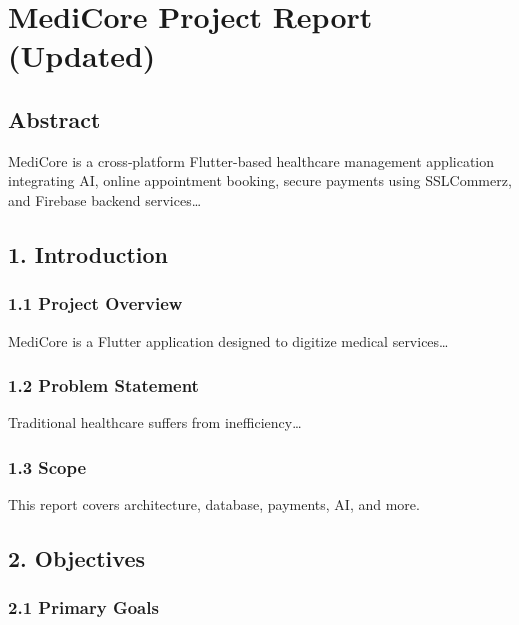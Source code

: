 \documentclass[
]{article}
\author{}
\date{}
\begin{document}
\hypertarget{medicore-project-report-updated}{%
\section{MediCore Project Report
(Updated)}\label{medicore-project-report-updated}}

\hypertarget{abstract}{%
\subsection{Abstract}\label{abstract}}

MediCore is a cross‑platform Flutter-based healthcare management
application integrating AI, online appointment booking, secure payments
using SSLCommerz, and Firebase backend services\ldots{}

\hypertarget{introduction}{%
\subsection{1. Introduction}\label{introduction}}

\hypertarget{project-overview}{%
\subsubsection{1.1 Project Overview}\label{project-overview}}

MediCore is a Flutter application designed to digitize medical
services\ldots{}

\hypertarget{problem-statement}{%
\subsubsection{1.2 Problem Statement}\label{problem-statement}}

Traditional healthcare suffers from inefficiency\ldots{}

\hypertarget{scope}{%
\subsubsection{1.3 Scope}\label{scope}}

This report covers architecture, database, payments, AI, and more.

\hypertarget{objectives}{%
\subsection{2. Objectives}\label{objectives}}

\hypertarget{primary-goals}{%
\subsubsection{2.1 Primary Goals}\label{primary-goals}}
\end{document}
